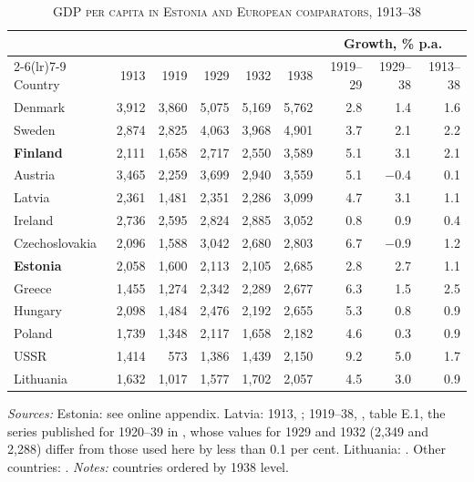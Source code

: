\begin{table}[htbp]
\centering\small
\caption[GDP per capita in Estonia and European comparators, 1913--38]{\textsc{GDP per capita in Estonia and European comparators, 1913--38}}
\label{tab:interwar}
\begin{threeparttable}
\begin{tabular}{lrrrrrrrr}
\toprule
& \multicolumn{5}{c}{\intlnineteen{}} & \multicolumn{3}{c}{Growth, \% p.a.} \\
\cmidrule(lr){2-6}\cmidrule(lr){7-9}
Country & 1913 & 1919 & 1929 & 1932 & 1938 & 1919--29 & 1929--38 & 1913--38 \\
\midrule
Denmark & 3,912 & 3,860 & 5,075 & 5,169 & 5,762 & 2.8 & 1.4 & 1.6 \\
Sweden & 2,874 & 2,825 & 4,063 & 3,968 & 4,901 & 3.7 & 2.1 & 2.2 \\
\textbf{Finland} & 2,111 & 1,658 & 2,717 & 2,550 & 3,589 & 5.1 & 3.1 & 2.1 \\
Austria & 3,465 & 2,259 & 3,699 & 2,940 & 3,559 & 5.1 & $-$0.4 & 0.1 \\
Latvia & 2,361 & 1,481 & 2,351 & 2,286 & 3,099 & 4.7 & 3.1 & 1.1 \\
Ireland & 2,736 & 2,595 & 2,824 & 2,885 & 3,052 & 0.8 & 0.9 & 0.4 \\
Czechoslovakia & 2,096 & 1,588 & 3,042 & 2,680 & 2,803 & 6.7 & $-$0.9 & 1.2 \\
\textbf{Estonia} & 2,058 & 1,600 & 2,113 & 2,105 & 2,685 & 2.8 & 2.7 & 1.1 \\
Greece & 1,455 & 1,274 & 2,342 & 2,289 & 2,677 & 6.3 & 1.5 & 2.5 \\
Hungary & 2,098 & 1,484 & 2,476 & 2,192 & 2,655 & 5.3 & 0.8 & 0.9 \\
Poland & 1,739 & 1,348 & 2,117 & 1,658 & 2,182 & 4.6 & 0.3 & 0.9 \\
USSR & 1,414 & 573 & 1,386 & 1,439 & 2,150 & 9.2 & 5.0 & 1.7 \\
Lithuania & 1,632 & 1,017 & 1,577 & 1,702 & 2,057 & 4.5 & 3.0 & 0.9 \\
\bottomrule
\end{tabular}
\begin{tablenotes}
\footnotesize
\textit{Sources:} Estonia: see online appendix. Latvia: 1913, \cite[603]{norkusmark2021}; 1919--38, \cite[316]{klimantas2025thesis}, table E.1, the series published for 1920--39 in \cite{Klimantas2024}, whose values for 1929 and 1932 (2,349 and 2,288) differ from those used here by less than 0.1 per cent. Lithuania: \cite{klimantas2023lithuania}. Other countries: \cite{mpd2023}. \textit{Notes:} countries ordered by 1938 level.
\end{tablenotes}
\end{threeparttable}
\end{table}
